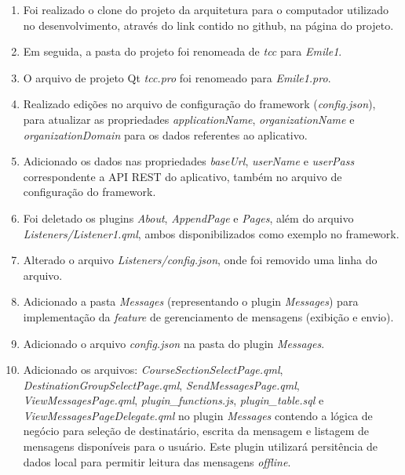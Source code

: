 \begin{enumerate}
	\item Foi realizado o clone do projeto da arquitetura para o computador utilizado no desenvolvimento, através do link contido no github, na página do projeto.

	\item Em seguida, a pasta do projeto foi renomeada de \textit{tcc} para \textit{Emile1}.

	\item O arquivo de projeto Qt \textit{tcc.pro} foi renomeado para \textit{Emile1.pro}.

	\item Realizado edições no arquivo de configuração do framework (\textit{config.json}), para atualizar as propriedades \textit{applicationName}, \textit{organizationName} e \textit{organizationDomain} para os dados referentes ao aplicativo.

	\item Adicionado os dados nas propriedades \textit{baseUrl}, \textit{userName} e \textit{userPass} correspondente a API REST do aplicativo, também no arquivo de configuração do framework.

	\item Foi deletado os plugins \textit{About}, \textit{AppendPage} e \textit{Pages}, além do arquivo \textit{Listeners/Listener1.qml}, ambos disponibilizados como exemplo no framework.

	\item Alterado o arquivo \textit{Listeners/config.json}, onde foi removido uma linha do arquivo.

	\item Adicionado a pasta \textit{Messages} (representando o plugin \textit{Messages}) para implementação da \textit{feature} de gerenciamento de mensagens (exibição e envio).

	\item Adicionado o arquivo \textit{config.json} na pasta do plugin \textit{Messages}.

	\item Adicionado os arquivos: \textit{CourseSectionSelectPage.qml}, \textit{DestinationGroupSelectPage.qml}, \textit{SendMessagesPage.qml}, \textit{ViewMessagesPage.qml}, \textit{plugin\_functions.js}, \textit{plugin\_table.sql} e \textit{ViewMessagesPageDelegate.qml} no plugin \textit{Messages} contendo a lógica de negócio para seleção de destinatário, escrita da mensagem e listagem de mensagens disponíveis para o usuário. Este plugin utilizará persitência de dados local para permitir leitura das mensagens \textit{offline}.


\end{enumerate}
